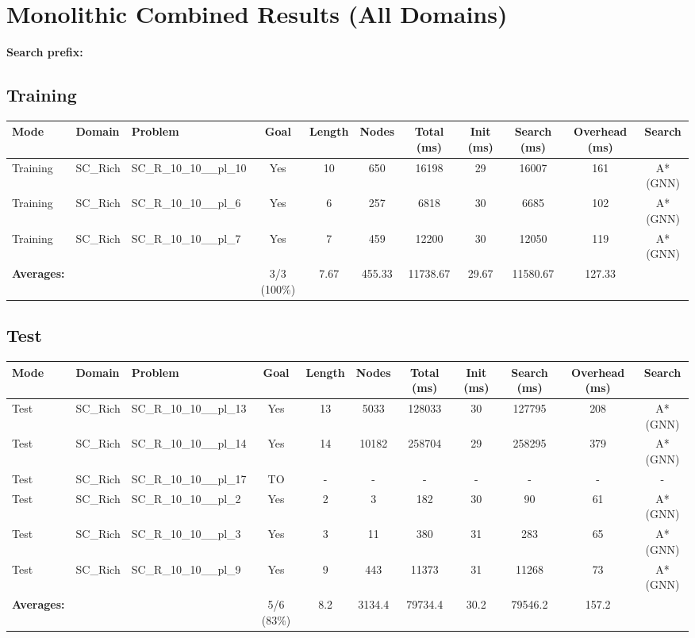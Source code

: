 \documentclass{article}
\begin{document}
\section*{Monolithic Combined Results (All Domains)}
\textbf{Search prefix:} 
\\[0.5cm]
\subsection*{Training}
\begin{tabular}{lllcccccccc}
\toprule
Mode & Domain & Problem & Goal & Length & Nodes & Total (ms) & Init (ms) & Search (ms) & Overhead (ms) & Search \\
\midrule
Training & SC\_Rich & SC\_R\_10\_10\_\_pl\_10 & Yes & 10 & 650 & 16198 & 29 & 16007 & 161 & A*(GNN) \\
Training & SC\_Rich & SC\_R\_10\_10\_\_pl\_6 & Yes & 6 & 257 & 6818 & 30 & 6685 & 102 & A*(GNN) \\
Training & SC\_Rich & SC\_R\_10\_10\_\_pl\_7 & Yes & 7 & 459 & 12200 & 30 & 12050 & 119 & A*(GNN) \\
\textbf{Averages:} & & & 3/3 (100\%) & 7.67 & 455.33 & 11738.67 & 29.67 & 11580.67 & 127.33 & \\
\bottomrule
\end{tabular}
\newpage
\subsection*{Test}
\begin{tabular}{lllcccccccc}
\toprule
Mode & Domain & Problem & Goal & Length & Nodes & Total (ms) & Init (ms) & Search (ms) & Overhead (ms) & Search \\
\midrule
Test & SC\_Rich & SC\_R\_10\_10\_\_pl\_13 & Yes & 13 & 5033 & 128033 & 30 & 127795 & 208 & A*(GNN) \\
Test & SC\_Rich & SC\_R\_10\_10\_\_pl\_14 & Yes & 14 & 10182 & 258704 & 29 & 258295 & 379 & A*(GNN) \\
Test & SC\_Rich & SC\_R\_10\_10\_\_pl\_17 & TO & - & - & - & - & - & - & - \\
Test & SC\_Rich & SC\_R\_10\_10\_\_pl\_2 & Yes & 2 & 3 & 182 & 30 & 90 & 61 & A*(GNN) \\
Test & SC\_Rich & SC\_R\_10\_10\_\_pl\_3 & Yes & 3 & 11 & 380 & 31 & 283 & 65 & A*(GNN) \\
Test & SC\_Rich & SC\_R\_10\_10\_\_pl\_9 & Yes & 9 & 443 & 11373 & 31 & 11268 & 73 & A*(GNN) \\
\textbf{Averages:} & & & 5/6 (83\%) & 8.2 & 3134.4 & 79734.4 & 30.2 & 79546.2 & 157.2 & \\
\bottomrule
\end{tabular}
\newpage
\end{document}
